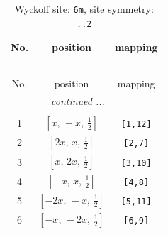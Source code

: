 \documentclass[fleqn,8pt]{jsarticle}
\begin{document}
\renewcommand{\arraystretch}{1.2}
\begin{longtable}{ccc}
\caption{Wyckoff site: {\tt 6m}, site symmetry: {\tt ..2}}
 \\
 \hline \hline
No. & position & mapping \\ \hline \endfirsthead

\multicolumn{2}{l}{\tablename\ \thetable{}} \\
 \hline \hline
No. & position & mapping \\ \hline \endhead

 \hline \hline
\multicolumn{2}{r}{\footnotesize\it continued ...} \\ \endfoot

 \hline \hline
\multicolumn{2}{r}{} \\ \endlastfoot

1 & $\left[ x,\, - x,\, \frac{1}{2} \right]$ & {\tt [1,12]} \\ \hline
2 & $\left[ 2 x,\, x,\, \frac{1}{2} \right]$ & {\tt [2,7]} \\ \hline
3 & $\left[ x,\, 2 x,\, \frac{1}{2} \right]$ & {\tt [3,10]} \\ \hline
4 & $\left[ - x,\, x,\, \frac{1}{2} \right]$ & {\tt [4,8]} \\ \hline
5 & $\left[ - 2 x,\, - x,\, \frac{1}{2} \right]$ & {\tt [5,11]} \\ \hline
6 & $\left[ - x,\, - 2 x,\, \frac{1}{2} \right]$ & {\tt [6,9]} \\
\end{longtable}
\renewcommand{\arraystretch}{1.2}
\end{document}
